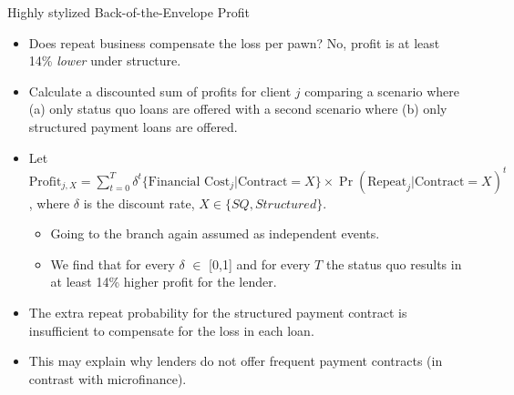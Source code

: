 \documentclass[9pt, aspectratio=169]{beamer}
\begin{document}
\begin{frame}{Highly stylized Back-of-the-Envelope Profit }

\begin{itemize}
    \item Does repeat business compensate the loss per pawn? No, profit is at least 14\% \textit{lower} under structure.
    \vfill \item Calculate a discounted sum of profits for client $j$ comparing a scenario where (a) only status quo loans are offered with a second scenario where (b) only structured payment loans are offered.
    \vfill \item Let $\text{Profit}_{j,X}  = \sum_{t=0}^T\delta^t\{\text{Financial Cost}_j | \text{Contract}=X\}\times\Pr(\text{Repeat}_j | \text{Contract}=X)^t$, where $\delta$ is the discount rate, $X \in \{SQ, Structured\}$. 
    \begin{itemize}
        \item Going to the branch again assumed as independent events.
        \item We find that for every  $\delta$ $\in$ [0,1]  and for every $T$ the status quo results in at least 14\% higher profit for the lender.
    \end{itemize} 
    \vfill\item The extra repeat probability for the structured payment contract is insufficient to compensate for the loss in each loan.

    \vfill\item This may explain why lenders do not offer frequent payment contracts (in contrast with microfinance).
\end{itemize}
 
\end{frame}
\end{document}
